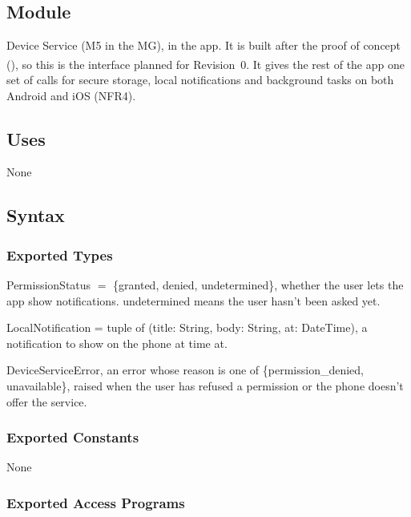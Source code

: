 \documentclass[12pt, titlepage]{article}
\begin{document}
\begingroup\raggedright
\subsection{Module}

Device Service (M5 in the MG), in the app. It is built after the proof of
concept (\textsuperscript{\dag}), so this is the interface planned for
Revision~0. It gives the rest of the app one set of calls for secure storage,
local notifications and background tasks on both Android and iOS (NFR4).

\subsection{Uses}

None

\subsection{Syntax}

\subsubsection{Exported Types}

\noindent PermissionStatus $=$ \{granted, denied, undetermined\}, whether the
user lets the app show notifications. undetermined means the user hasn't been
asked yet.

\medskip
\noindent LocalNotification = tuple of (title: String, body: String, at:
DateTime), a notification to show on the phone at time at.

\medskip
\noindent DeviceServiceError, an error whose reason is one of
\{permission\_denied, unavailable\}, raised when the user has refused a
permission or the phone doesn't offer the service.

\subsubsection{Exported Constants}

None

\subsubsection{Exported Access Programs}
\end{document}
